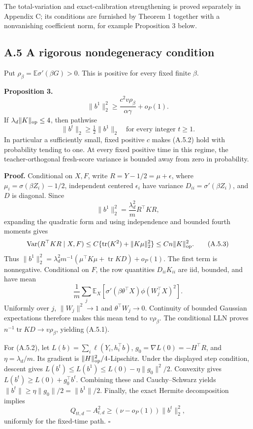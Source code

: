 \documentclass[
  11pt,
  a4paper,
]{article}
\begin{document}
The total-variation and exact-calibration strengthening is proved
separately in Appendix C; its conditions are furnished by Theorem 1
together with a nonvanishing coefficient norm, for example Proposition 3
below.

\hypertarget{a.5-a-rigorous-nondegeneracy-condition}{%
\subsection{A.5 A rigorous nondegeneracy
condition}\label{a.5-a-rigorous-nondegeneracy-condition}}

Put \(\rho_\beta=\mathbb E\sigma'(\beta G)>0\). This is positive for
every fixed finite \(\beta\).

\textbf{Proposition 3.} \[
\|b^1\|_2^2\ge\frac{c^2v\rho_\beta}{\alpha\gamma}+o_P(1). \tag{A.5.1}
\] If \(\lambda_d\|K\|_{\rm op}\le4\), then pathwise \[
\|b^t\|_2\ge\tfrac12\|b^1\|_2\quad\text{for every integer }t\ge1. \tag{A.5.2}
\] In particular a sufficiently small, fixed positive \(c\) makes
(A.5.2) hold with probability tending to one. At every fixed positive
time in this regime, the teacher-orthogonal fresh-score variance is
bounded away from zero in probability.

\textbf{Proof.} Conditional on \(X,F\), write \(R=Y-1/2=\mu+\epsilon\),
where \(\mu_i=\sigma(\beta Z_i)-1/2\), independent centered
\(\epsilon_i\) have variance \(D_{ii}=\sigma'(\beta Z_i)\), and \(D\) is
diagonal. Since \[
\|b^1\|_2^2=\frac{\lambda_d^2}{m}R^\top KR,
\] expanding the quadratic form and using independence and bounded
fourth moments gives \[
\operatorname{Var}(R^\top KR\mid X,F)
\le C\{\operatorname{tr}(K^2)+\|K\mu\|_2^2\}
\le Cn\|K\|_{\rm op}^2. \tag{A.5.3}
\] Thus
\(\|b^1\|_2^2=\lambda_d^2m^{-1}(\mu^\top K\mu+\operatorname{tr}KD)+o_P(1)\).
The first term is nonnegative. Conditional on \(F\), the row quantities
\(D_{ii}K_{ii}\) are iid, bounded, and have mean \[
\frac1m\sum_j\mathbb E_X[\sigma'(\beta\theta^\top X)\phi(W_j^\top X)^2].
\] Uniformly over \(j\), \(\|W_j\|^2\to1\) and \(\theta^\top W_j\to0\).
Continuity of bounded Gaussian expectations therefore makes this mean
tend to \(v\rho_\beta\). The conditional LLN proves
\(n^{-1}\operatorname{tr}KD\to v\rho_\beta\), yielding (A.5.1).

For (A.5.2), let \(L(b)=\sum_i\ell(Y_i,h_i^\top b)\),
\(g_0=\nabla L(0)=-H^\top R\), and \(\eta=\lambda_d/m\). Its gradient is
\(\|H\|_{\rm op}^2/4\)-Lipschitz. Under the displayed step condition,
descent gives \(L(b^t)\le L(b^1)\le L(0)-\eta\|g_0\|^2/2\). Convexity
gives \(L(b^t)\ge L(0)+g_0^\top b^t\). Combining these and
Cauchy--Schwarz yields \(\|b^t\|\ge\eta\|g_0\|/2=\|b^1\|/2\). Finally,
the exact Hermite decomposition implies \[
Q_{tt,d}-A_{t,d}^2\ge(\nu-o_P(1))\|b^t\|_2^2, \tag{A.5.4}
\] uniformly for the fixed-time path. \(\square\)
\end{document}
